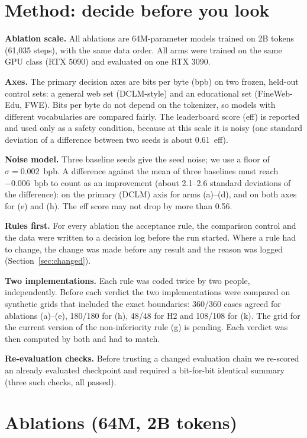 \section{Method: decide before you look}

\textbf{Ablation scale.} All ablations are 64M-parameter models trained on 2B tokens (61,035 steps), with the same
data order. All arms were trained on the same GPU class (RTX 5090) and evaluated on one RTX 3090.

\textbf{Axes.} The primary decision axes are bits per byte (bpb) on two frozen, held-out control sets: a general web
set (DCLM-style) and an educational set (FineWeb-Edu, FWE). Bits per byte do not depend on the tokenizer, so models
with different vocabularies are compared fairly. The leaderboard score (eff) is reported and used only as a safety
condition, because at this scale it is noisy (one standard deviation of a difference between two seeds is about
0.61~eff).

\textbf{Noise model.} Three baseline seeds give the seed noise; we use a floor of $\sigma = 0.002$~bpb. A difference
against the mean of three baselines must reach $-0.006$~bpb to count as an improvement (about 2.1--2.6 standard
deviations of the difference): on the primary (DCLM) axis for arms (a)--(d), and on both axes for (e) and (h). The
eff score may not drop by more than 0.56.

\textbf{Rules first.} For every ablation the acceptance rule, the comparison control and the data were written to a
decision log before the run started. Where a rule had to change, the change was made before any result and the reason
was logged (Section~\ref{sec:changed}).

\textbf{Two implementations.} Each rule was coded twice by two people, independently. Before each verdict the two
implementations were compared on synthetic grids that included the exact boundaries: 360/360 cases agreed for
ablations (a)--(e), 180/180 for (h), 48/48 for H2 and 108/108 for (k). The grid for the current version of the
non-inferiority rule (g) is pending. Each verdict was then computed by both and had to match.

\textbf{Re-evaluation checks.} Before trusting a changed evaluation chain we re-scored an already evaluated checkpoint
and required a bit-for-bit identical summary (three such checks, all passed).

\section{Ablations (64M, 2B tokens)}

